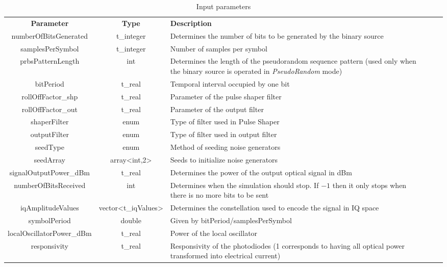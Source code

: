 \begin{refsection}
\begin{table}[H]
	\centering
	\caption{Input parameters}
	\begin{tabular}{|c|c|p{70mm}|ccp{70mm}}
		\cline{1-3}
		\textbf{Parameter} & \textbf{Type} & \textbf{Description} &    \\ \cline{1-3}
		numberOfBitsGenerated & t\_integer & Determines the number of bits to be generated by the binary source  &    \\ \cline{1-3}
		samplesPerSymbol & t\_integer & Number of samples per symbol &    \\ \cline{1-3}
		prbsPatternLength & int & Determines the length of the pseudorandom sequence pattern (used only when the binary source is operated in \textit{PseudoRandom} mode) &    \\ \cline{1-3}
		bitPeriod & t\_real & Temporal interval occupied by one bit &    \\ \cline{1-3}
		rollOffFactor\_shp & t\_real & Parameter of the pulse shaper filter &    \\ \cline{1-3}
		rollOffFactor\_out & t\_real & Parameter of the output filter &    \\ \cline{1-3}
		shaperFilter & enum & Type of filter used in Pulse Shaper &    \\ \cline{1-3}
		outputFilter & enum & Type of filter used in output filter &    \\ \cline{1-3}
		seedType & enum & Method of seeding noise generators &    \\ \cline{1-3}
		seedArray & array<int,2> & Seeds to initialize noise generators &    \\ \cline{1-3}
		signalOutputPower\_dBm & t\_real & Determines the power of the output optical signal in dBm &  \\ \cline{1-3}
		numberOfBitsReceived & int &   Determines when the simulation should stop. If $-1$ then it only stops when there is no more bits to be sent&   \\ \cline{1-3}
		iqAmplitudeValues & vector<t\_iqValues> & Determines the constellation used to encode the signal in IQ space &    \\ \cline{1-3}
		symbolPeriod & double & Given by bitPeriod/samplesPerSymbol &    \\ \cline{1-3}
		localOscillatorPower\_dBm & t\_real & Power of the local oscillator &    \\ \cline{1-3}
		responsivity & t\_real & Responsivity of the photodiodes (1 corresponds to having all optical power transformed into electrical current) &    \\ \cline{1-3}

\end{tabular}
\end{table}
\end{refsection}
